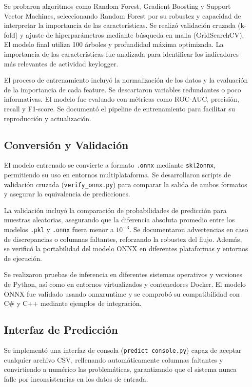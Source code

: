 \documentclass{article}
\begin{document}
Se probaron algoritmos como Random Forest, Gradient Boosting y Support Vector Machines, seleccionando Random Forest por su robustez y capacidad de interpretar la importancia de las características. Se realizó validación cruzada (k-fold) y ajuste de hiperparámetros mediante búsqueda en malla (GridSearchCV). El modelo final utiliza 100 árboles y profundidad máxima optimizada. La importancia de las características fue analizada para identificar los indicadores más relevantes de actividad keylogger.

El proceso de entrenamiento incluyó la normalización de los datos y la evaluación de la importancia de cada feature. Se descartaron variables redundantes o poco informativas. El modelo fue evaluado con métricas como ROC-AUC, precisión, recall y F1-score. Se documentó el pipeline de entrenamiento para facilitar su reproducción y actualización.

\subsection{Conversión y Validación}
El modelo entrenado se convierte a formato \texttt{.onnx} mediante \texttt{skl2onnx}, permitiendo su uso en entornos multiplataforma. Se desarrollaron scripts de validación cruzada (\texttt{verify_onnx.py}) para comparar la salida de ambos formatos y asegurar la equivalencia de predicciones.

La validación incluyó la comparación de probabilidades de predicción para muestras aleatorias, asegurando que la diferencia absoluta promedio entre los modelos \texttt{.pkl} y \texttt{.onnx} fuera menor a $10^{-3}$. Se documentaron advertencias en caso de discrepancias o columnas faltantes, reforzando la robustez del flujo. Además, se verificó la portabilidad del modelo ONNX en diferentes plataformas y entornos de ejecución.

Se realizaron pruebas de inferencia en diferentes sistemas operativos y versiones de Python, así como en entornos virtualizados y contenedores Docker. El modelo ONNX fue validado usando onnxruntime y se comprobó su compatibilidad con C# y C++ mediante ejemplos de integración.

\subsection{Interfaz de Predicción}
Se implementó una interfaz de consola (\texttt{predict_console.py}) capaz de aceptar cualquier archivo CSV, rellenando automáticamente columnas faltantes y convirtiendo a numérico las problemáticas, garantizando que el sistema nunca falle por inconsistencias en los datos de entrada.
\end{document}
